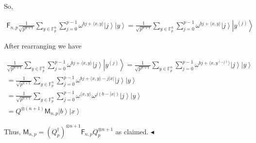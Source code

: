 So,\par


\[\begin{gathered}
\displaystyle\mathsf{F}_{n,p}\frac{1}{\sqrt{p^{n+1}}}\sum_{y\in\mathbb{F}_{p}^{n}}\sum_{j=0}^{p-1}\omega^{bj+\langle x,y\rangle}\left|j\right\rangle\left|y\right\rangle \displaystyle=\frac{1}{\sqrt{p^{n+1}}}\sum_{y\in\mathbb{F}_{p}^{n}}\sum_{j=0}^{p-1}\omega^{bj+\langle x,y\rangle}\left|j\right\rangle\left|y^{(j)}\right\rangle
\end{gathered}\]


After rearranging we have\par


\[\begin{gathered}
\displaystyle\frac{1}{\sqrt{p^{n+1}}}\sum_{y\in\mathbb{F}_{p}^{n}}\sum_{j=0}^{p-1}\omega^{bj+\langle x,y\rangle}\left|j\right\rangle\left|y^{(j)}\right\rangle \displaystyle=\frac{1}{\sqrt{p^{n+1}}}\sum_{y\in\mathbb{F}_{p}^{n}}\sum_{j=0}^{p-1}\omega^{bj+\langle x,y^{(-j)}\rangle}\left|j\right\rangle\left|y\right\rangle \\
\displaystyle=\frac{1}{\sqrt{p^{n+1}}}\sum_{y\in\mathbb{F}_{p}^{n}}\sum_{j=0}^{p-1}\omega^{bj+\langle x,y\rangle-j|x|}\left|j\right\rangle\left|y\right\rangle \\
\displaystyle=\frac{1}{\sqrt{p^{n+1}}}\sum_{y\in\mathbb{F}_{p}^{n}}\sum_{j=0}^{p-1}\omega^{\langle x,y\rangle}\omega^{j(b-|x|)}\left|j\right\rangle\left|y\right\rangle \\
\displaystyle=Q^{\otimes(n+1)}\mathsf{M}_{n,p}\left|b\right\rangle\left|x\right\rangle
\end{gathered}\]


Thus, $\mathsf{M}_{n,p}=(Q_{p}^{\dagger})^{\otimes{n+1}}\mathsf{F}_{n,p}Q_{p}^{\otimes{n+1}}$ as claimed.
$\blacktriangleleft$\par




\par



